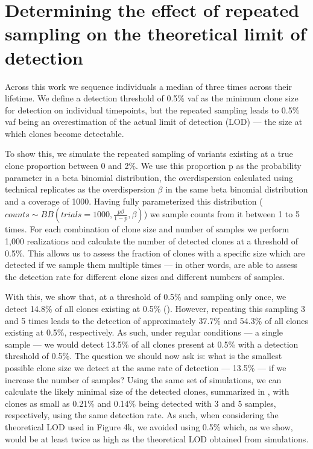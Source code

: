 \chapter{Determining the effect of repeated sampling on the theoretical limit of detection}
\label{appendix:theoretical-lod}

Across this work we sequence individuals a median of three times across their lifetime. We define a detection threshold of 0.5\% \ac{vaf} as the minimum clone size for detection on individual timepoints, but the repeated sampling leads to 0.5\% \ac{vaf} being an overestimation of the actual limit of detection (LOD) --- the size at which clones become detectable.

To show this, we simulate the repeated sampling of variants existing at a true clone proportion between 0 and 2\%. We use this proportion p as the probability parameter in a beta binomial distribution, the overdispersion  calculated using technical replicates as the overdispersion $\beta$ in the same beta binomial distribution and a coverage of 1000. Having fully parameterized this distribution ($counts \sim BB(trials=1000,\frac{p\beta}{1-p},\beta)$) we sample counts from it between 1 to 5 times. For each combination of clone size and number of samples we perform 1,000 realizations and calculate the number of detected clones at a threshold of 0.5\%. This allows us to assess the fraction of clones with a specific size which are detected if we sample them multiple times --- in other words, are able to assess the detection rate for different clone sizes and different numbers of samples.

With this, we show that, at a threshold of 0.5\% and sampling only once, we detect 14.8\% of all clones existing at 0.5\% (). However, repeating this sampling 3 and 5 times leads to the detection of approximately 37.7\% and 54.3\% of all clones existing at 0.5\%, respectively. As such, under regular conditions --- a single sample --- we would detect 13.5\% of all clones present at 0.5\% with a detection threshold of 0.5\%. The question we should now ask is: what is the smallest possible clone size we detect at the same rate of detection --- 13.5\% --- if we increase the number of samples? Using the same set of simulations, we can calculate the likely minimal size of the detected clones, summarized in , with clones as small as 0.21\% and 0.14\% being detected with 3 and 5 samples, respectively, using the same detection rate. As such, when considering the theoretical LOD used in Figure 4k, we avoided using 0.5\% which, as we show, would be at least twice as high as the theoretical LOD obtained from simulations.

